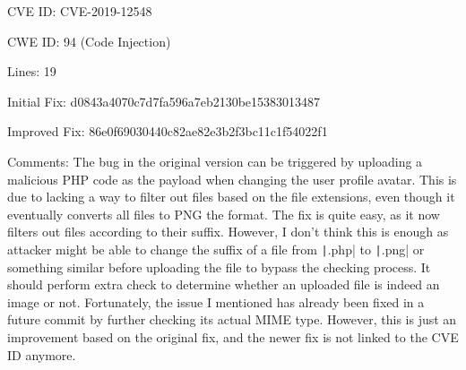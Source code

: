 \documentclass[12pt]{article}
\begin{document}
CVE ID: CVE-2019-12548

CWE ID: 94 (Code Injection)

Lines: 19

Initial Fix: d0843a4070c7d7fa596a7eb2130be15383013487

Improved Fix: 86e0f69030440c82ae82e3b2f3bc11c1f54022f1

Comments: The bug in the original version can be triggered by uploading a malicious PHP code as the payload when changing the user profile avatar. This is due to lacking a way to filter out files based on the file extensions, even though it eventually converts all files to PNG the format. The fix is quite easy, as it now filters out files according to their suffix. However, I don't think this is enough as attacker might be able to change the suffix of a file from \texttt|.php| to \texttt|.png| or something similar before uploading the file to bypass the checking process. It should perform extra check to determine whether an uploaded file is indeed an image or not. Fortunately, the issue I mentioned has already been fixed in a future commit by further checking its actual MIME type. However, this is just an improvement based on the original fix, and the newer fix is not linked to the CVE ID anymore.
\end{document}
